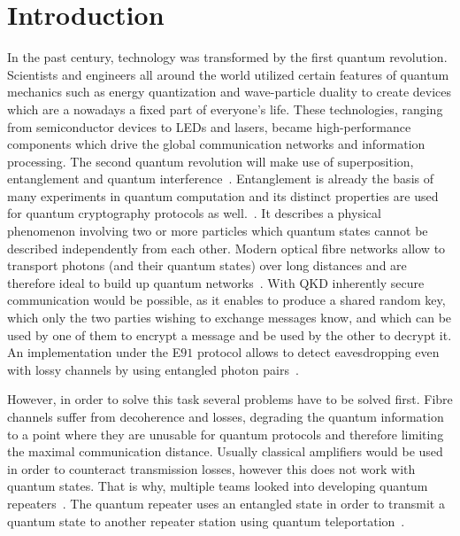 \chapter{Introduction}

In the past century, technology was transformed by the first quantum revolution. Scientists and engineers all around the world utilized certain features of quantum mechanics such as energy quantization and wave-particle duality to create devices which are a nowadays a fixed part of everyone's life.
These technologies, ranging from semiconductor devices to LEDs and lasers, became high-performance components which drive the global communication networks and information processing.
The second quantum revolution will make use of superposition, entanglement and quantum interference~\cite{macfarlane_quantum_2003}.
Entanglement is already the basis of many experiments in quantum computation and its distinct properties are used for quantum cryptography protocols as well.~\cite{zeilinger_light_2017}.
It describes a physical phenomenon involving two or more particles which quantum states cannot be described independently from each other.
Modern optical fibre networks allow to transport photons (and their quantum states) over long distances and are therefore ideal to build up quantum networks~\cite{gisin_quantum_2002}.
With \ac{QKD} inherently secure communication would be possible, as it enables to produce a shared random key, which only the two parties wishing to exchange messages know, and which can be used by one of them to encrypt a message and be used by the other to decrypt it.
An implementation under the E$91$ protocol allows to detect eavesdropping even with lossy channels by using entangled photon pairs~\cite{ekert_quantum_1991}.

However, in order to solve this task several problems have to be solved first.
Fibre channels suffer from decoherence and losses, degrading the quantum information to a point where they are unusable for quantum protocols and therefore limiting the maximal communication distance.
Usually classical amplifiers would be used in order to counteract transmission losses, however this does not work with quantum states.
That is why, multiple teams looked into developing quantum repeaters~\cite{reindl_all-photonic_2018}\cite{duan_long-distance_2001}\cite{simon_quantum_2007}.
The quantum repeater uses an entangled state in order to transmit a quantum state to another repeater station using quantum teleportation~\cite{bennett_teleporting_1993}.

